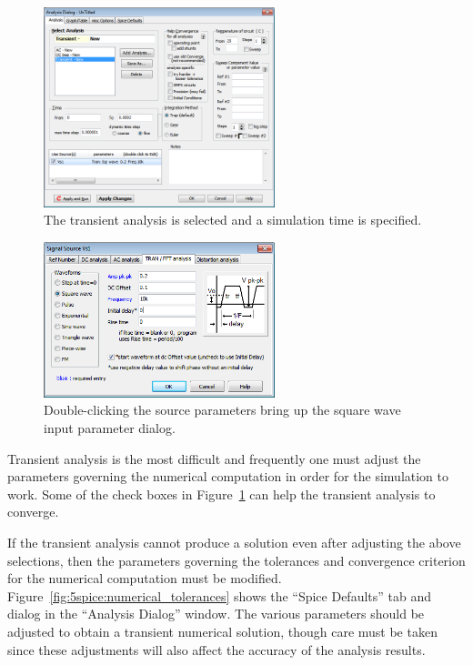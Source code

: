 \documentclass{article}
\begin{document}
\begin{figure}
\begin{center}
\includegraphics[width=0.6\textwidth]{pics/5spice_transient_analysis}
\end{center}
\caption{The transient analysis is selected and a simulation time is specified.}
\label{fig:5spice:transient_analysis}
\end{figure}

\begin{figure}
\begin{center}
\includegraphics[width=0.6\textwidth]{pics/5spice_transient_analysis_square_wave}
\end{center}
\caption{Double-clicking the source parameters bring up the square wave input parameter dialog.}
\label{fig:5spice:transient_analysis_square_wave}
\end{figure}

Transient analysis is the most difficult and frequently one must adjust the parameters governing the numerical computation in order for the simulation to work. Some of the check boxes in Figure~\ref{fig:5spice:transient_analysis} can help the transient analysis to converge.

If the transient analysis cannot produce a solution even after adjusting the above selections, then the parameters governing the tolerances and convergence criterion for the numerical computation must be modified.  Figure~\ref{fig:5spice:numerical_tolerances} shows the ``Spice Defaults'' tab and dialog in the ``Analysis Dialog'' window. The various parameters should be adjusted to obtain a transient numerical solution, though care must be taken since these adjustments will also affect the accuracy of the analysis results.  
\end{document}
